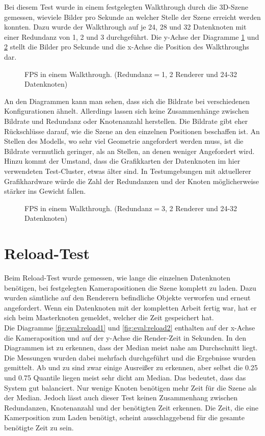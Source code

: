 Bei diesem Test wurde in einem festgelegten Walkthrough durch die 3D-Szene gemessen, wieviele Bilder pro Sekunde an welcher Stelle der Szene erreicht werden konnten. Dazu wurde der Walkthrough auf je 24, 28 und 32 Datenknoten mit einer Redundanz von 1, 2 und 3 durchgeführt. Die y-Achse der Diagramme \ref{fig:eval:fps1} und \ref{fig:eval:fps3} stellt die Bilder pro Sekunde und die x-Achse die Position des Walkthroughs dar.
\begin{figure}
\centering

  \caption{\label{fig:eval:fps1}FPS in einem Walkthrough. (Redundanz$=$1, 2 Renderer und 24-32 Datenknoten)}
\end{figure}
An den Diagrammen kann man sehen, dass sich die Bildrate bei verschiedenen Konfigurationen ähnelt. Allerdings lassen sich keine Zusammenhänge zwischen Bildrate und Redundanz oder Knotenanzahl herstellen. Die Bildrate gibt eher Rückschlüsse darauf, wie die Szene an den einzelnen Positionen beschaffen ist. An Stellen des Modells, wo sehr viel Geometrie angefordert werden muss, ist die Bildrate vermutlich geringer, als an Stellen, an denen weniger Angefordert wird. Hinzu kommt der Umstand, dass die Grafikkarten der Datenknoten im hier verwendeten Test-Cluster, etwas älter sind. In Testumgebungen mit aktuellerer Grafikhardware würde die Zahl der Redundanzen und der Knoten möglicherweise stärker ins Gewicht fallen.

\begin{figure}
\centering

  \caption{\label{fig:eval:fps3}FPS in einem Walkthrough. (Redundanz$=$3, 2 Renderer und 24-32 Datenknoten)}
\end{figure}

\section{Reload-Test}
\label{sec:eval:reload}

Beim Reload-Test wurde gemessen, wie lange die einzelnen Datenknoten benötigen, bei festgelegten Kamerapositionen die Szene komplett zu laden. Dazu wurden sämtliche auf den Renderern befindliche Objekte verworfen und erneut angefordert. Wenn ein Datenknoten mit der kompletten Arbeit fertig war, hat er sich beim Masterknoten gemeldet, welcher die Zeit gespeichert hat.\\
Die Diagramme \ref{fig:eval:reload1} und \ref{fig:eval:reload2} enthalten auf der x-Achse die Kameraposition und auf der y-Achse die Render-Zeit in Sekunden. In den Diagrammen ist zu erkennen, dass der Median meist nahe am Durchschnitt liegt. Die Messungen wurden dabei mehrfach durchgeführt und die Ergebnisse wurden gemittelt. Ab und zu sind zwar einige Ausreißer zu erkennen, aber selbst die 0.25 und 0.75 Quantile liegen meist sehr dicht am Median. Das bedeutet, dass das System gut balanciert. Nur wenige Knoten benötigen mehr Zeit für die Szene als der Median. Jedoch lässt auch dieser Test keinen Zusammenhang zwischen Redundanzen, Knotenanzahl und der benötigten Zeit erkennen. Die Zeit, die eine Kamerposition zum Laden benötigt, scheint ausschlaggebend für die gesamte benötigte Zeit zu sein.

